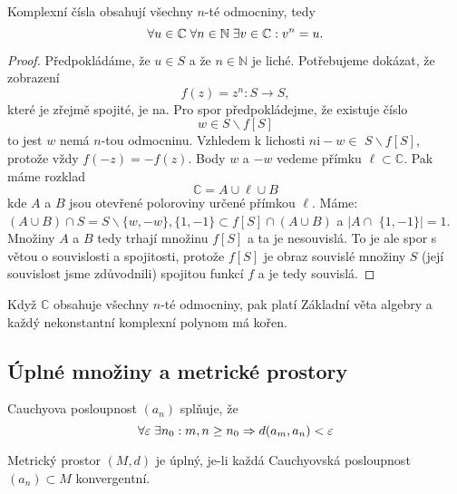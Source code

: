 \documentclass[../main.tex]{subfiles}
\begin{document}
\begin{theorem}
    Komplexní čísla obsahují všechny $n$-té odmocniny, tedy
    \[ \forall u \in \mathbb{C} \hspace{1mm} \forall n \in \mathbb{N} \hspace{1mm} \exists v \in \mathbb{C}: v^n = u. \]
\end{theorem}
\begin{proof}
    Předpokládáme, že $u \in S$ a že $n \in \mathbb{N}$ je liché. Potřebujeme dokázat, že zobrazení
    $$
    f(z)=z^n: S \rightarrow S,
    $$
    které je zřejmě spojité, je na. Pro spor předpokládejme, že existuje číslo
    $$
    w \in S \backslash f[S]
    $$
    to jest $w$ nemá $n$-tou odmocninu. Vzhledem k lichosti $n \mathrm{i}-w \in$ $S \backslash f[S]$, protože vždy $f(-z)=-f(z)$.
    Body $w$ a $-w$ vedeme přímku $\ell \subset \mathbb{C}$. Pak máme rozklad
    $$
    \mathbb{C}=A \cup \ell \cup B
    $$
    kde $A$ a $B$ jsou otevřené poloroviny určené přímkou $\ell$. Máme: $(A \cup B) \cap S=S \backslash\{w,-w\},\{1,-1\} \subset f[S] \cap(A \cup B)$ 
    a $\mid A \cap$ $\{1,-1\} \mid=1$. Množiny $A$ a $B$ tedy trhají množinu $f[S]$ a ta je nesouvislá. To je ale spor s větou o souvislosti a spojitosti,
    protože $f[S]$ je obraz souvislé množiny $S$ (její souvislost jsme zdůvodnili) spojitou funkcí $f$ a je tedy souvislá.
\end{proof}

\begin{lemma}
    Když $\mathbb{C}$ obsahuje všechny $n$-té odmocniny, pak platí Základní věta algebry a každý nekonstantní
    komplexní polynom má kořen.
\end{lemma}

\subsection{Úplné množiny a metrické prostory}

\begin{definition}
    Cauchyova posloupnost $(a_n)$ splňuje, že
    \[ \forall \varepsilon \hspace{1mm} \exists n_0: m,n \geq n_0 \Rightarrow d(a_m,a_n) < \varepsilon \]
\end{definition}

\begin{definition}
    Metrický prostor $(M,d)$ je úplný, je-li každá Cauchyovská posloupnost $(a_n) \subset M$ konvergentní.
\end{definition}
\end{document}
